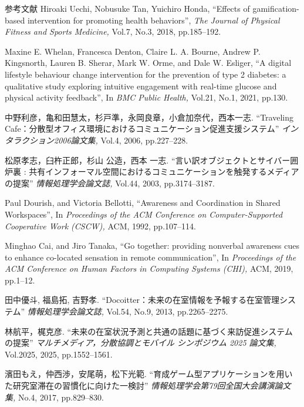 \begin{thebibliography}{参考文献}
  Hiroaki Uechi, Nobusuke Tan, Yuichiro Honda,
  ``Effects of gamification-based intervention for promoting health behaviors'',
  {\sl The Journal of Physical Fitness and Sports Medicine,}
  Vol.7,
  No.3,
  2018,
  pp.185--192.

  Maxine E. Whelan, Francesca Denton, Claire L. A. Bourne, Andrew P. Kingsnorth, Lauren B. Sherar, Mark W. Orme, and Dale W. Esliger,
  ``A digital lifestyle behaviour change intervention for the prevention of type 2 diabetes: a qualitative study exploring intuitive engagement with real-time glucose and physical activity feedback'',
  In {\sl BMC Public Health,}
  Vol.21,
  No.1,
  2021,
  pp.130.

  中野利彦，亀和田慧太，杉戸準，永岡良章，小倉加奈代，西本一志.
  ``Traveling Cafe：分散型オフィス環境におけるコミュニケーション促進支援システム''
  {\sl インタラクション2006論文集,}
  Vol.4,
  2006,
  pp.227--228.

  松原孝志，臼杵正郎，杉山 公造，西本 一志.
  ``言い訳オブジェクトとサイバー囲炉裏 : 共有インフォーマル空間におけるコミュニケーションを触発するメディアの提案''
  {\sl 情報処理学会論文誌,}
  Vol.44,
  2003,
  pp.3174--3187.

  Paul Dourish, and Victoria Bellotti,
  ``Awareness and Coordination in Shared Workspaces'',
  In {\sl Proceedings of the ACM Conference on Computer-Supported Cooperative Work (CSCW),}
  ACM,
  1992,
  pp.107--114.

  Minghao Cai, and Jiro Tanaka,
  ``Go together: providing nonverbal awareness cues to enhance co-located sensation in remote communication'',
  In {\sl Proceedings of the ACM Conference on Human Factors in Computing Systems (CHI),}
  ACM,
  2019,
  pp.1--12.

  田中優斗, 福島拓, 吉野孝.
  ``Docoitter：未来の在室情報を予報する在室管理システム''
  {\sl 情報処理学会論文誌,}
  Vol.54,
  No.9,
  2013,
  pp.2265--2275.

  林航平，梶克彦.
  ``未来の在室状況予測と共通の話題に基づく来訪促進システムの提案''
  {\sl マルチメディア，分散協調とモバイル シンポジウム 2025 論文集,}
  Vol.2025,%
  2025,
  pp.1552--1561.

  濱田もえ，仲西渉，安尾萌，松下光範.
  ``育成ゲーム型アプリケーションを用いた研究室滞在の習慣化に向けた一検討''
  {\sl 情報処理学会第79回全国大会講演論文集,}
  No.4,
  2017,
  pp.829--830.


\end{thebibliography}
